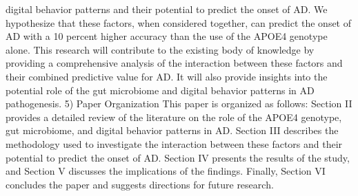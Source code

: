 \documentclass[conference]{IEEEtran}
\begin{document}
digital behavior patterns and their potential to predict the onset of AD. We hypothesize that these factors, when considered together, can predict the onset of AD with a 10 percent higher accuracy than the use of the APOE4 genotype alone. This research will contribute to the existing body of knowledge by providing a comprehensive analysis of the interaction between these factors and their combined predictive value for AD. It will also provide insights into the potential role of the gut microbiome and digital behavior patterns in AD pathogenesis. 5) Paper Organization This paper is organized as follows: Section II provides a detailed review of the literature on the role of the APOE4 genotype, gut microbiome, and digital behavior patterns in AD. Section III describes the methodology used to investigate the interaction between these factors and their potential to predict the onset of AD. Section IV presents the results of the study, and Section V discusses the implications of the findings. Finally, Section VI concludes the paper and suggests directions for future research.
\end{document}
